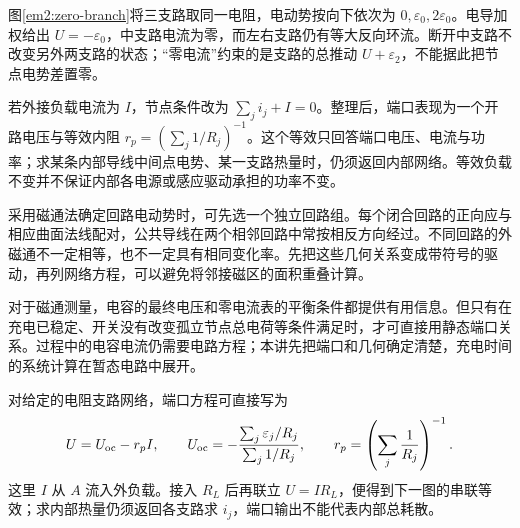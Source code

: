 图\ref{em2:zero-branch}将三支路取同一电阻，电动势按向下依次为 $0,\varepsilon_0,2\varepsilon_0$。电导加权给出 $U=-\varepsilon_0$，中支路电流为零，而左右支路仍有等大反向环流。断开中支路不改变另外两支路的状态；“零电流”约束的是支路的总推动 $U+\varepsilon_2$，不能据此把节点电势差置零。



若外接负载电流为 $I$，节点条件改为 $\sum_j i_j+I=0$。整理后，端口表现为一个开路电压与等效内阻 $r_p=(\sum_j1/R_j)^{-1}$。这个等效只回答端口电压、电流与功率；求某条内部导线中间点电势、某一支路热量时，仍须返回内部网络。等效负载不变并不保证内部各电源或感应驱动承担的功率不变。


采用磁通法确定回路电动势时，可先选一个独立回路组。每个闭合回路的正向应与相应曲面法线配对，公共导线在两个相邻回路中常按相反方向经过。不同回路的外磁通不一定相等，也不一定具有相同变化率。先把这些几何关系变成带符号的驱动，再列网络方程，可以避免将邻接磁区的面积重叠计算。


对于磁通测量，电容的最终电压和零电流表的平衡条件都提供有用信息。但只有在充电已稳定、开关没有改变孤立节点总电荷等条件满足时，才可直接用静态端口关系。过程中的电容电流仍需要电路方程；本讲先把端口和几何确定清楚，充电时间的系统计算在暂态电路中展开。


对给定的电阻支路网络，端口方程可直接写为
\[
U=U_{\rm oc}-r_p I,\qquad
U_{\rm oc}=-\frac{\sum_j\varepsilon_j/R_j}{\sum_j1/R_j},\qquad
r_p=\left(\sum_j\frac1{R_j}\right)^{-1}.
\]
这里 $I$ 从 $A$ 流入外负载。接入 $R_L$ 后再联立 $U=IR_L$，便得到下一图的串联等效；求内部热量仍须返回各支路求 $i_j$，端口输出不能代表内部总耗散。






